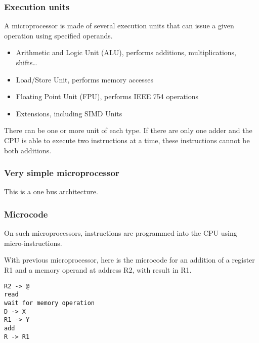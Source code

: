 
\begin{frame}
  \frametitle{Execution units}

  A microprocessor is made of several execution units that can issue a
  given operation using specified operands.

  \begin{itemize}
  \item
    Arithmetic and Logic Unit (ALU), performs additions, multiplications, shifts\ldots
  \item
    Load/Store Unit, performs memory accesses
  \item
    Floating Point Unit (FPU), performs IEEE 754 operations
  \item
    Extensions, including SIMD Units
  \end{itemize}

  There can be one or more unit of each type. If there are only one
  adder and the CPU is able to execute two instructions at a time,
  these instructions cannot be both additions.

\end{frame}


\begin{frame}
  \frametitle{Very simple microprocessor}

  \begin{center}
  \end{center}

  This is a one bus architecture.

\end{frame}


\begin{frame}[containsverbatim]
  \frametitle{Microcode}

  On such microprocessors, instructions are programmed into the CPU
  using micro-instructions.

  \-

  With previous microprocessor, here is the microcode for an addition
  of a register R1 and a memory operand at address R2, with result in
  R1.

  \begin{verbatim}
R2 -> @
read
wait for memory operation
D -> X
R1 -> Y
add
R -> R1
  \end{verbatim}

\end{frame}

